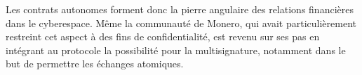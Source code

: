 Les contrats autonomes forment donc la pierre angulaire des relations financières dans le cyberespace. Même la communauté de Monero, qui avait particulièrement restreint cet aspect à des fins de confidentialité, est revenu sur ses pas en intégrant au protocole la possibilité pour la multisignature, notamment dans le but de permettre les échanges atomiques.

\printendnotes